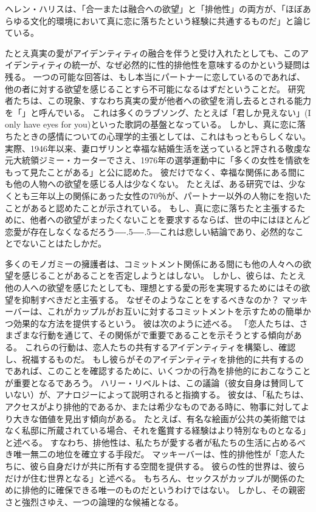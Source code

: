 \documentclass[paper=a4,book,openany]{jlreq}
\newcommand{\ig}[1]{}           %
\def\DDASH{―\kern-.5\zw―\kern-.5\zw―}
\begin{document}
ヘレン・ハリス\ig{Helen Harris}は、「合一または融合への欲望」と「排他性」の両方が、「ほぼあらゆる文化的環境において真に恋に落ちたという経験に共通するものだ」と論じている\citep[pp. 102--103]{harris95:_rethin_polyn_heter_relat}。

たとえ真実の愛がアイデンティティの融合を伴うと受け入れたとしても、このアイデンティティの統一が、なぜ必然的に性的排他性を意味するのかという疑問は残る。
一つの可能な回答は、もし本当にパートナーに恋しているのであれば、他の者に対する欲望を感じることすら不可能になるはずだということだ。
研究者たちは、この現象、すなわち真実の愛が他者への欲望を消し去るとされる能力を「」と呼んでいる。
これは多くのラブソング、たとえば「君しか見えない」(I only have eyes for you)といった歌詞の基盤となっている。
しかし、真に恋に落ちたときの感情についての心理学的主張としては、これはもっともらしくない。
実際、1946年以来、妻ロザリンと幸福な結婚生活を送っていると評される敬虔な元大統領ジミー・カーターでさえ、1976年の選挙運動中に「多くの女性を情欲をもって見たことがある」と公に認めた。
彼だけでなく、幸福な関係にある間にも他の人物への欲望を感じる人は少なくない。
たとえば、ある研究では、少なくとも三年以上の関係にあった女性の70％が、パートナー以外の人物にを抱いたことがあると認めたことが示されている\citep{barnhart16:_women_exper_feelin_attrac_someon}。
もし、真に恋に落ちたと主張するために、他者への欲望がまったくないことを要求するならば、世の中にはほとんど恋愛が存在しなくなるだろう{\DDASH}これは悲しい結論であり、必然的なことでないことはたしかだ。

多くのモノガミーの擁護者は、コミットメント関係にある間にも他の人々への欲望を感じることがあることを否定しようとはしない。
しかし、彼らは、たとえ他の人への欲望を感じたとしても、理想とする愛の形を実現するためにはその欲望を抑制すべきだと主張する。
なぜそのようなことをするべきなのか？ マッキーバーは、これがカップルがお互いに対するコミットメントを示すための簡単かつ効果的な方法を提供するという。
彼は次のように述べる。
「恋人たちは、さまざまな行動を通じて、その関係がで重要であることを示そうとする傾向がある。
これらの行動は、恋人たちの共有するアイデンティティを構築し、確認し、祝福するものだ。
もし彼らがそのアイデンティティを排他的に共有するのであれば、このことを確認するために、いくつかの行為を排他的におこなうことが重要となるであろう\citep[p.361]{mckeever17:_is_requir_sexual_exclus_consis_roman_love}。
ハリー・リベルトは、この議論（彼女自身は賛同していない）が、アナロジーによって説明されると指摘する。
彼女は、「私たちは、アクセスがより排他的であるか、または希少なものである時に、物事に対してより大きな価値を見出す傾向がある。
たとえば、有名な絵画が公共の美術館ではなく私邸に所蔵されている場合、それを鑑賞する経験はより特別なものとなる」と述べる\citep[p.410]{liberto17:_prob_sexual_prom}。
すなわち、排他性は、私たちが愛する者が私たちの生活に占めるべき唯一無二の地位を確立する手段だ。
マッキーバーは、性的排他性が「恋人たちに、彼ら自身だけが共に所有する空間を提供する。
彼らの性的世界は、彼らだけが住む世界となる」と述べる\citep[p.61]{mckeever17:_is_requir_sexual_exclus_consis_roman_love}。
もちろん、セックスがカップルが関係のために排他的に確保できる唯一のものだというわけではない。
しかし、その親密さと強烈さゆえ、一つの論理的な候補となる\citep[p.6]{york19:_why_monog_is_moral_permis}。
\end{document}
